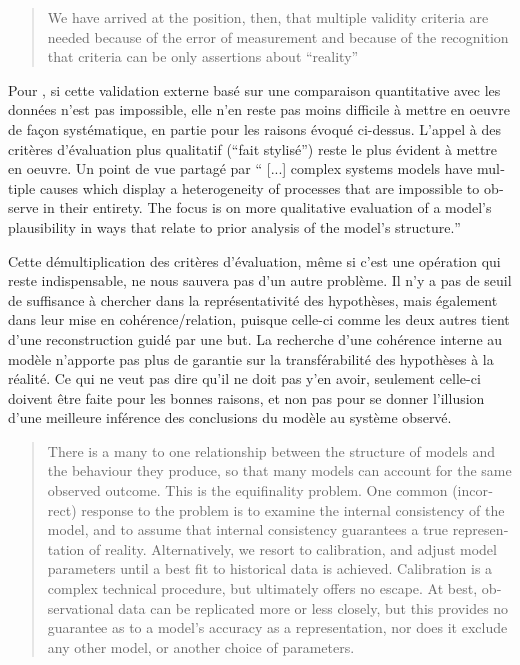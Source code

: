 \foreignblockquote{english}[\cite{Hermann1967}]{We have arrived at the position, then, that multiple validity criteria are needed because of the error of measurement and because of the recognition that criteria can be only assertions about \enquote{reality}}

Pour \textcite{Amblard2006}, si cette validation externe basé sur une comparaison quantitative avec les données n'est pas impossible, elle n'en reste pas moins difficile à mettre en oeuvre de façon systématique, en partie pour les raisons évoqué ci-dessus. L'appel à des critères d'évaluation plus qualitatif (\enquote{fait stylisé}) reste le plus évident à mettre en oeuvre. Un point de vue partagé par \textcite{Batty2001} \foreignquote{english}{ [...] complex systems models have multiple causes which display a heterogeneity of processes that are impossible to observe in their entirety. The focus is on more qualitative evaluation of a model’s plausibility in ways that relate to prior analysis of the model’s structure.} 

Cette démultiplication des critères d'évaluation, même si c'est une opération qui reste indispensable, ne nous sauvera pas d'un autre problème. Il n'y a pas de seuil de suffisance à chercher dans la représentativité des hypothèses, mais également dans leur mise en cohérence/relation, puisque celle-ci comme les deux autres tient d'une reconstruction guidé par une but. La recherche d'une cohérence interne au modèle n'apporte pas plus de garantie sur la transférabilité des hypothèses à la réalité. Ce qui ne veut pas dire qu'il ne doit pas y'en avoir, seulement celle-ci doivent être faite pour les bonnes raisons, et non pas pour se donner l'illusion d'une meilleure inférence des conclusions du modèle au système observé.

\foreignblockquote{english}[\cite{OSullivan2004}]{There is a many to one relationship between the structure of models and the behaviour they produce, so that many models can account for the same observed outcome. This is the equifinality problem. One common (incorrect) response to the problem is to examine the internal consistency of the model, and to assume that internal consistency guarantees a true representation of reality. Alternatively, we resort to calibration, and adjust model parameters until a best fit to historical data is achieved. Calibration is a complex technical procedure, but ultimately offers no escape. At best, observational data can be replicated more or less closely, but this provides no guarantee as to a model’s accuracy as a representation, nor does it exclude any other model, or another choice of parameters.}

